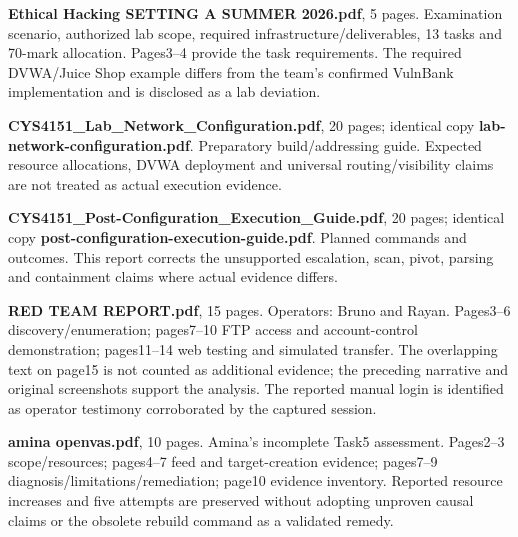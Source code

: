 \documentclass[11pt,a4paper]{article}
\begin{document}
\begin{description}[leftmargin=1cm,style=nextline]
\item[D1]\label{src:D1}\textbf{Ethical Hacking SETTING A SUMMER 2026.pdf}, 5 pages. Examination scenario, authorized lab scope, required infrastructure/deliverables, 13 tasks and 70-mark allocation. Pages3--4 provide the task requirements. The required DVWA/Juice Shop example differs from the team's confirmed VulnBank implementation and is disclosed as a lab deviation.
\item[D2]\label{src:D2}\textbf{CYS4151\_Lab\_Network\_Configuration.pdf}, 20 pages; identical copy \textbf{lab-network-configuration.pdf}. Preparatory build/addressing guide. Expected resource allocations, DVWA deployment and universal routing/visibility claims are not treated as actual execution evidence.
\item[D3]\label{src:D3}\textbf{CYS4151\_Post-Configuration\_Execution\_Guide.pdf}, 20 pages; identical copy \textbf{post-configuration-execution-guide.pdf}. Planned commands and outcomes. This report corrects the unsupported escalation, scan, pivot, parsing and containment claims where actual evidence differs.
\item[D4]\label{src:D4}\textbf{RED TEAM REPORT.pdf}, 15 pages. Operators: Bruno and Rayan. Pages3--6 discovery/enumeration; pages7--10 FTP access and account-control demonstration; pages11--14 web testing and simulated transfer. The overlapping text on page15 is not counted as additional evidence; the preceding narrative and original screenshots support the analysis. The reported manual login is identified as operator testimony corroborated by the captured session.
\item[D5]\label{src:D5}\textbf{amina openvas.pdf}, 10 pages. Amina's incomplete Task5 assessment. Pages2--3 scope/resources; pages4--7 feed and target-creation evidence; pages7--9 diagnosis/limitations/remediation; page10 evidence inventory. Reported resource increases and five attempts are preserved without adopting unproven causal claims or the obsolete rebuild command as a validated remedy.
\end{description}
\end{document}
